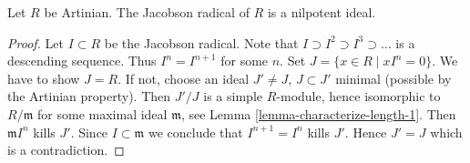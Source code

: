 \begin{lemma}
\label{lemma-artinian-radical-nilpotent}
Let $R$ be Artinian. The Jacobson radical of $R$ is a nilpotent ideal.
\end{lemma}

\begin{proof}
Let $I \subset R$ be the Jacobson radical.
Note that $I \supset I^2 \supset I^3 \supset \ldots$ is a descending
sequence. Thus $I^n = I^{n + 1}$ for some $n$.
Set $J = \{ x\in R \mid xI^n = 0\}$. We have to show $J = R$.
If not, choose an ideal $J' \not = J$, $J \subset J'$ minimal (possible
by the Artinian property). Then $J'/J$ is a simple $R$-module, hence
isomorphic to $R/\mathfrak m$ for some maximal ideal $\mathfrak m$,
see Lemma \ref{lemma-characterize-length-1}.
Then $\mathfrak m I^n$ kills $J'$. Since $I \subset \mathfrak m$
we conclude that $I^{n + 1} = I^n$ kills $J'$. Hence $J' = J$
which is a contradiction.
\end{proof}